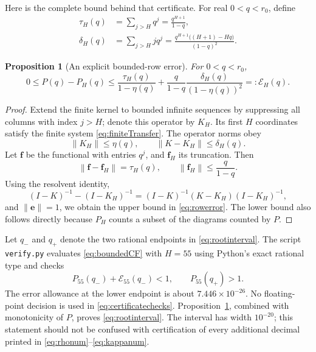 \documentclass[11pt,letterpaper]{article}
\numberwithin{equation}{section}
\newtheorem{proposition}[theorem]{Proposition}
\theoremstyle{definition}
\newcommand{\opnorm}[1]{\left\lVert#1\right\rVert}
\begin{document}
Here is the complete bound behind that certificate. For real
$0<q<r_0$, define
\begin{align}
 \tau_H(q)&=\sum_{j>H}q^j=\frac{q^{H+1}}{1-q},\label{eq:tau}\\
 \delta_H(q)&=\sum_{j>H}jq^j
 =\frac{q^{H+1}\bigl((H+1)-Hq\bigr)}{(1-q)^2}.
 \label{eq:delta}
\end{align}

\begin{proposition}[An explicit bounded-row error]
\label{prop:rowerror}
For $0<q<r_0$,
\begin{equation}
 0\le P(q)-P_H(q)\le
 \frac{\tau_H(q)}{1-\eta(q)}+
 \frac{q}{1-q}\frac{\delta_H(q)}{(1-\eta(q))^2}
 =:\mathcal E_H(q).
 \label{eq:rowerror}
\end{equation}
\end{proposition}
\begin{proof}
Extend the finite kernel to bounded infinite sequences by suppressing all
columns with index $j>H$; denote this operator by $K_H$. Its first $H$
coordinates satisfy the finite system \eqref{eq:finiteTransfer}. The
operator norms obey
\[
 \opnorm{K_H}\le\eta(q),\qquad
 \opnorm{K-K_H}\le\delta_H(q).
\]
Let $\mathbf f$ be the functional with entries $q^j$, and $\mathbf f_H$
its truncation. Then
\[
 \opnorm{\mathbf f-\mathbf f_H}=\tau_H(q),\qquad
 \opnorm{\mathbf f_H}\le\frac{q}{1-q}.
\]
Using the resolvent identity,
\[
 (I-K)^{-1}-(I-K_H)^{-1}
 =(I-K)^{-1}(K-K_H)(I-K_H)^{-1},
\]
and $\opnorm{\mathbf e}=1$, we obtain the upper bound in
\eqref{eq:rowerror}. The lower bound also follows directly because
$P_H$ counts a subset of the diagrams counted by $P$.
\end{proof}

Let $q_-$ and $q_+$ denote the two rational endpoints in
\eqref{eq:rootinterval}. The script \texttt{verify.py} evaluates
\eqref{eq:boundedCF} with $H=55$ using Python's exact rational type and
checks
\begin{equation}
 P_{55}(q_-)+\mathcal E_{55}(q_-)<1,
 \qquad P_{55}(q_+)>1.
 \label{eq:certificatechecks}
\end{equation}
The error allowance at the lower endpoint is about
$7.446\times10^{-26}$. No floating-point decision is used in
\eqref{eq:certificatechecks}. Proposition~\ref{prop:rowerror}, combined
with monotonicity of $P$, proves \eqref{eq:rootinterval}. The interval has
width $10^{-20}$; this statement should not be confused with certification
of every additional decimal printed in \eqref{eq:rhonum}--\eqref{eq:kappanum}.
\end{document}
